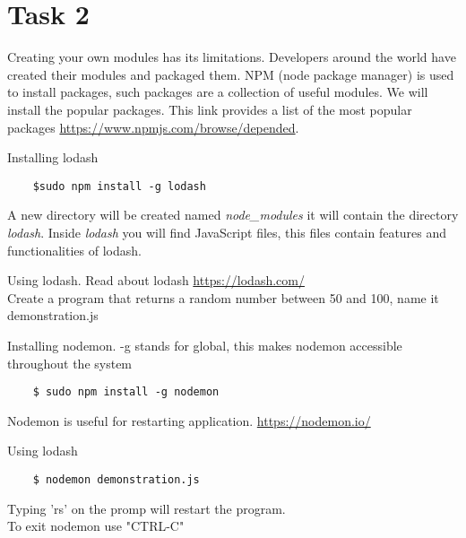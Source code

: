 \documentclass[12pt]{article}
\begin{document}
\section*{Task 2} 
Creating your own modules has its limitations. Developers around the world have created their modules and packaged them. NPM (node package manager) is used to install packages, such packages are a collection of useful modules. We will install the popular packages. This link provides a list of the most popular packages \href{https://www.npmjs.com/browse/depended}{https://www.npmjs.com/browse/depended}.
\begin{todolist}
    \item Installing lodash 
    \begin{lstlisting}
    $sudo npm install -g lodash
    \end{lstlisting}
    A new directory will be created named \textit{node\_modules} it will contain the directory \textit{lodash}. Inside \textit{lodash} you will find JavaScript files, this files contain features and functionalities of lodash. 
    \item Using lodash. Read about lodash \href{https://lodash.com/}{https://lodash.com/}\\
    Create a program that returns a random number between 50 and 100, name it demonstration.js 
    
    \item Installing nodemon. -g stands for global, this makes nodemon accessible throughout the system 
    \begin{lstlisting}
    $ sudo npm install -g nodemon 
    \end{lstlisting}
    Nodemon is useful for restarting application. \href{https://nodemon.io/}{https://nodemon.io/}
    \item Using lodash \\
    \begin{lstlisting}
    $ nodemon demonstration.js
    \end{lstlisting}
    Typing 'rs' on the promp will restart the program.\\
    To exit nodemon use "CTRL-C" 
\end{todolist}
\end{document}
